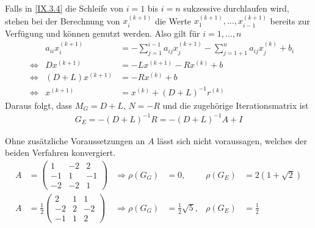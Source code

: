 Falls in \eqref{IX.3.4} die Schleife von $i=1$ bis $i=n$
sukzessive durchlaufen wird, stehen bei der Berechnung von
$x_i^{(k+1)}$ die Werte $x_1^{(k+1)},\ldots,x_{i-1}^{(k+1)}$
bereits zur Verfügung und können genutzt werden.
Also gilt für $i=1,\ldots,n$
\begin{align}
  &&a_{ii}x_i^{(k+1)} & = -\sum_{j=1}^{i-1}a_{ij}x_j^{(k+1)}
                        -\sum_{j=1+1}^{n}a_{ij}x_j^{(k)}+ b_i
                        \label{IX.3.5} \\\nonumber
  &\Longleftrightarrow &Dx^{(k+1)}&=-Lx^{(k+1)}-Rx^{(k)}+b \\
  &\Longleftrightarrow &(D+L)x^{(k+1)}&=-Rx^{(k)}+b
                                    \label{IX.3.6} \\\nonumber
  &\Longleftrightarrow &x^{(k+1)} &= x^{(k)}+(D+L)^{-1}r^{(k)}
\end{align}
Daraus folgt, dass $M_G=D+L$, $N=-R$ 
und die zugehörige Iterationsmatrix ist 
\begin{gather*}
  G_E = -(D+L)^{-1}R = -(D+L)^{-1}A+I
\end{gather*}

\begin{Bspe}
  Ohne zusätzliche Voraussetzungen an $A$ lässt sich
  nicht voraussagen, welches der beiden Verfahren konvergiert.
  \begin{align*}
    A&= \begin{pmatrix}
      1&-2&2\\
      -1&1&-1\\
      -2&-2&1
    \end{pmatrix}
    &\Longrightarrow \rho(G_G)&=0, &\rho(G_E)&=2(1+\sqrt{2})\\
    A&= \frac{1}{2}\begin{pmatrix}
      2&1&1\\
      -2&2&-2\\
      -1&1&2
    \end{pmatrix}
    &\Longrightarrow \rho(G_G)&=\frac{1}{2}\sqrt{5}, &\rho(G_E)&=\frac{1}{2}
  \end{align*}
\end{Bspe}

